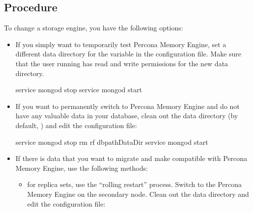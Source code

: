 \documentclass[letterpaper,10pt,english]{sphinxmanual}
\begin{document}
\subsection{Procedure}
\label{\detokenize{inmemory:procedure}}
\sphinxAtStartPar
To change a storage engine, you have the following options:
\begin{itemize}
\item {} 
\sphinxAtStartPar
If you simply want to temporarily test Percona Memory Engine, set a different
data directory for the  variable in the configuration file.
Make sure that the user running  has read and write
permissions for the new data directory.

\begin{sphinxVerbatim}[commandchars=\\\{\}]
\PYGZdl{} service mongod stop
\PYGZdl{} 
\PYGZdl{} 
\PYGZdl{} 
\PYGZdl{} service mongod start
\end{sphinxVerbatim}

\item {} 
\sphinxAtStartPar
If you want to permanently switch to Percona Memory Engine and do not have any
valuable data in your database, clean out the  data directory
(by default, ) and edit the configuration file:

\begin{sphinxVerbatim}[commandchars=\\\{\}]
\PYGZdl{} service mongod stop
\PYGZdl{} rm \PYGZhy{}rf \PYGZlt{}dbpathDataDir\PYGZgt{}
\PYGZdl{} 
\PYGZdl{} 
\PYGZdl{} 
\PYGZdl{} 
\PYGZdl{} service mongod start
\end{sphinxVerbatim}

\item {} 
\sphinxAtStartPar
If there is data that you want to migrate
and make compatible with Percona Memory Engine,
use the following methods:
\begin{itemize}
\item {} 
\sphinxAtStartPar
for replica sets, use the “rolling restart” process.
Switch to the Percona Memory Engine on the secondary node. Clean out the  data directory and edit the configuration file:


\end{itemize}
\end{itemize}
\end{document}

